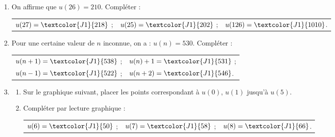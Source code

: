 \begin{enumerate}[resume]
    \item On affirme que $u(26)=210$. Compléter :

    \begin{tabularx}{\linewidth}{XXX}
        $u(27)=\textcolor{J1}{218}$ ;&
        $u(25)=\textcolor{J1}{202}$ ;&
        $u(126)=\textcolor{J1}{1010}$.\\
    \end{tabularx}
    \item Pour une certaine valeur de $n$ inconnue, on a : $u(n)=530$. Compléter :

    \begin{tabularx}{\linewidth}{XX}
        $u(n+1)=\textcolor{J1}{538}$ ;&
        $u(n)+1=\textcolor{J1}{531}$ ;\\
        $u(n-1)=\textcolor{J1}{522}$ ;&
        $u(n+2)=\textcolor{J1}{546}$.\\
    \end{tabularx}
    \item
    \begin{enumerate}
        \item Sur le graphique suivant, placer les points correspondant à $u(0)$, $u(1)$ jusqu'à $u(5)$.
        \begin{center}
        \end{center}
        \item Compléter par lecture graphique :

        \begin{tabularx}{\linewidth}{XXX}
            $u(6)=\textcolor{J1}{50}$ ;&
            $u(7)=\textcolor{J1}{58}$ ;&
            $u(8)=\textcolor{J1}{66}$.\\
        \end{tabularx}
    \end{enumerate}
\end{enumerate}

